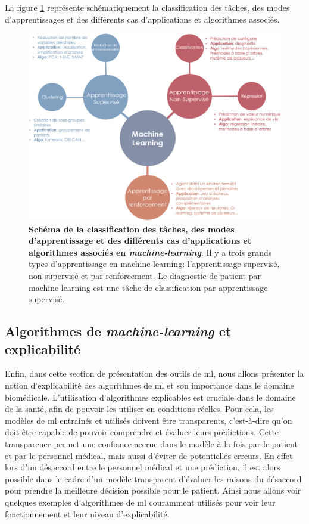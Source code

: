La figure \ref{fig:ml-landscape} représente schématiquement la classification des tâches, des modes d'apprentissages et des différents cas d'applications et algorithmes associés.
\begin{figure}[!htbp]
 \centering
 \includegraphics[width=1\textwidth]{figures/ml_landscape.png}
 \caption[Schéma des méthodes de machine-learning]{\textbf{Schéma de la classification des tâches, des modes d'apprentissage et des différents cas d'applications et algorithmes associés en \textit{machine-learning}}. Il y a trois grands types d'apprentissage en machine-learning: l'apprentissage supervisé, non supervisé et par renforcement. Le diagnostic de patient par machine-learning est une tâche de classification par apprentissage supervisé.}
 \label{fig:ml-landscape}
\end{figure}

\subsection{Algorithmes de \textit{machine-learning} et explicabilité}\label{xai-sec}
Enfin, dans cette section de présentation des outils de \gls{ml}, nous allons présenter la notion d'explicabilité des algorithmes de \gls{ml} et son importance dans le domaine biomédicale. L'utilisation d'algorithmes explicables est cruciale dans le domaine de la santé, afin de pouvoir les utiliser en conditions réelles. Pour cela, les modèles de \gls{ml} entrainés et utilisés doivent être transparents, c'est-à-dire qu'on doit être capable de pouvoir comprendre et évaluer leurs prédictions. Cette transparence permet une confiance accrue dans le modèle à la fois par le patient et par le personnel médical, mais aussi d'éviter de potentielles erreurs. En effet lors d'un désaccord entre le personnel médical et une prédiction, il est alors possible dans le cadre d'un modèle transparent d'évaluer les raisons du désaccord pour prendre la meilleure décision possible pour le patient. Ainsi nous allons voir quelques exemples d'algorithmes de \gls{ml} couramment utilisés pour voir leur fonctionnement et leur niveau d'explicabilité.

